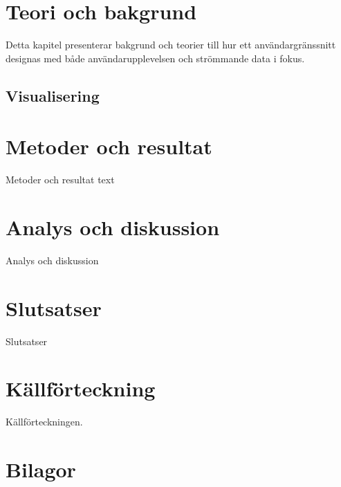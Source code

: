 \documentclass{kththesis}
\begin{document}
\chapter{Teori och bakgrund}

Detta kapitel presenterar bakgrund och teorier till hur ett användargränssnitt designas med både användarupplevelsen och strömmande data i fokus. 

\section{Visualisering} 
\subsection{} 




\chapter{Metoder och resultat}
Metoder och resultat text
\blindtext


\chapter{Analys och diskussion}
Analys och diskussion
\blindtext


\chapter{Slutsatser}
Slutsatser
\blindtext

\chapter{Källförteckning}
Källförteckningen.


\chapter{Bilagor}
\end{document}
